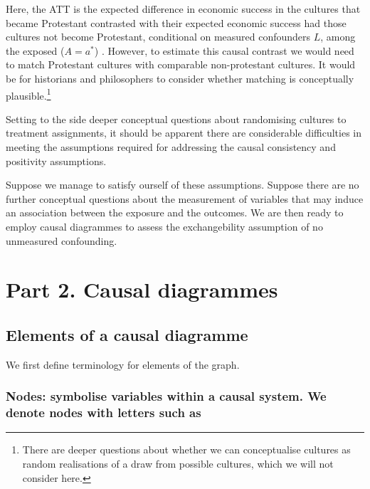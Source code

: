 \documentclass[
  singlecolumn]{report}
\begin{document}
Here, the ATT is the expected difference in economic success in the
cultures that became Protestant contrasted with their expected economic
success had those cultures not become Protestant, conditional on
measured confounders \(L\), among the exposed (\(A = a^*\)) . However,
to estimate this causal contrast we would need to match Protestant
cultures with comparable non-protestant cultures. It would be for
historians and philosophers to consider whether matching is conceptually
plausible.\footnote{There are deeper questions about whether we can
  conceptualise cultures as random realisations of a draw from possible
  cultures, which we will not consider here.}

Setting to the side deeper conceptual questions about randomising
cultures to treatment assignments, it should be apparent there are
considerable difficulties in meeting the assumptions required for
addressing the causal consistency and positivity assumptions.

Suppose we manage to satisfy ourself of these assumptions. Suppose there
are no further conceptual questions about the measurement of variables
that may induce an association between the exposure and the outcomes. We
are then ready to employ causal diagrammes to assess the exchangebility
assumption of no unmeasured confounding.

\hypertarget{part-2.-causal-diagrammes}{%
\section{Part 2. Causal diagrammes}\label{part-2.-causal-diagrammes}}

\hypertarget{elements-of-a-causal-diagramme}{%
\subsection{Elements of a causal
diagramme}\label{elements-of-a-causal-diagramme}}

We first define terminology for elements of the graph.

\hypertarget{nodes-symbolise-variables-within-a-causal-system.-we-denote-nodes-with-letters-such-as}{%
\subsubsection{\texorpdfstring{\textbf{Nodes:} symbolise variables
within a causal system. We denote nodes with letters such
as}{Nodes: symbolise variables within a causal system. We denote nodes with letters such as}}\label{nodes-symbolise-variables-within-a-causal-system.-we-denote-nodes-with-letters-such-as}}
\end{document}
